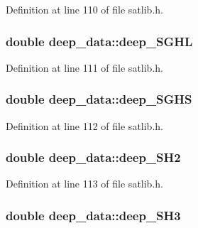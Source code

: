 Definition at line 110 of file satlib.\-h.

\hypertarget{structdeep__data_ae984a8c27a04f6825c4807bc1770152b}{
\subsubsection[{deep\-\_\-\-S\-G\-H\-L}]{\setlength{\rightskip}{0pt plus 5cm}double deep\-\_\-data\-::deep\-\_\-\-S\-G\-H\-L}}\label{structdeep__data_ae984a8c27a04f6825c4807bc1770152b}


Definition at line 111 of file satlib.\-h.

\hypertarget{structdeep__data_a18636737b0c3986d3880001368545e81}{
\subsubsection[{deep\-\_\-\-S\-G\-H\-S}]{\setlength{\rightskip}{0pt plus 5cm}double deep\-\_\-data\-::deep\-\_\-\-S\-G\-H\-S}}\label{structdeep__data_a18636737b0c3986d3880001368545e81}


Definition at line 112 of file satlib.\-h.

\hypertarget{structdeep__data_adb5e294c6e5cb72a46bea2c7ea935404}{
\subsubsection[{deep\-\_\-\-S\-H2}]{\setlength{\rightskip}{0pt plus 5cm}double deep\-\_\-data\-::deep\-\_\-\-S\-H2}}\label{structdeep__data_adb5e294c6e5cb72a46bea2c7ea935404}


Definition at line 113 of file satlib.\-h.

\hypertarget{structdeep__data_a05cd2fb4785ea30938072931dd06bf0f}{
\subsubsection[{deep\-\_\-\-S\-H3}]{\setlength{\rightskip}{0pt plus 5cm}double deep\-\_\-data\-::deep\-\_\-\-S\-H3}}\label{structdeep__data_a05cd2fb4785ea30938072931dd06bf0f}


